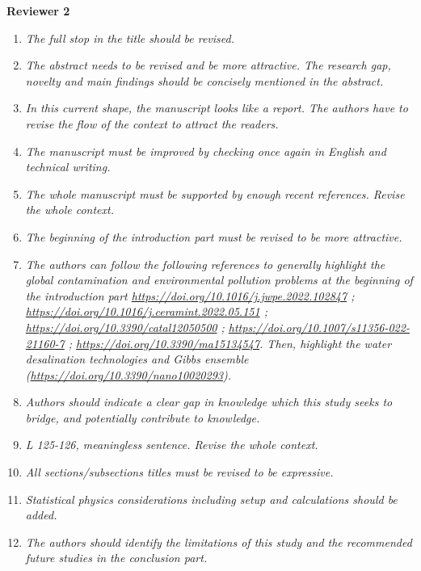 \documentclass[12pt]{dinbrief}
\begin{document}
\textbf{Reviewer 2}

\textit{}
\begin{enumerate}
\item \textit{The full stop in the title should be revised.}
\item \textit{The abstract needs to be revised and be more attractive. The research gap, novelty and main findings should be concisely mentioned in the abstract.}
\item \textit{In this current shape, the manuscript looks like a report. The authors have to revise the flow of the context to attract the readers.}
\item \textit{The manuscript must be improved by checking once again in English and technical writing. }

\item \textit{The whole manuscript must be supported by enough recent references. Revise the whole context.}
\item \textit{The beginning of the introduction part must be revised to be more attractive.}
\item \textit{The authors can follow the following references to generally highlight the global contamination and environmental pollution problems at the beginning of the introduction part  \href{https://doi.org/10.1016/j.jwpe.2022.102847}{https://doi.org/10.1016/j.jwpe.2022.102847} ; \href{https://doi.org/10.1016/j.ceramint.2022.05.151}{https://doi.org/10.1016/j.ceramint.2022.05.151} ; 
\href{https://doi.org/10.3390/catal12050500}{https://doi.org/10.3390/catal12050500} ; 
\href{https://doi.org/10.1007/s11356-022-21160-7}{https://doi.org/10.1007/s11356-022-21160-7} ; 
\href{https://doi.org/10.3390/ma15134547}{https://doi.org/10.3390/ma15134547}. 
Then, highlight the water desalination technologies and Gibbs ensemble (\href{https://doi.org/10.3390/nano10020293}{https://doi.org/10.3390/nano10020293}).}
\item \textit{Authors should indicate a clear gap in knowledge which this study seeks to bridge, and potentially contribute to knowledge. }

\item \textit{L 125-126, meaningless sentence. Revise the whole context.}
\item \textit{All sections/subsections titles must be revised to be expressive.}
\item \textit{Statistical physics considerations including setup and calculations should be added.}
\item \textit{The authors should identify the limitations of this study and the recommended future studies in the conclusion part.
}
\end{enumerate}








\end{document}
